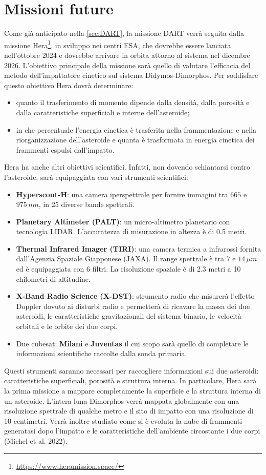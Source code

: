 \documentclass[a4paper,11pt,openright]{book}
\begin{document}
\section{Missioni future}
Come già anticipato nella \cref{sec:DART}, la missione DART verrà seguita dalla missione Hera\footnote{\href{https://www.heramission.space/}{https://www.heramission.space/}}, in sviluppo nei centri ESA, che dovrebbe essere lanciata nell'ottobre 2024 e dovrebbe arrivare in orbita attorno al sistema nel dicembre 2026. L'obiettivo principale della missione sarà quello di valutare l'efficacia del metodo dell'impattatore cinetico sul sistema Didymos-Dimorphos. Per soddisfare questo obiettivo Hera dovrà determinare: 
\begin{itemize}
    \item quanto il trasferimento di momento dipende dalla densità, dalla porosità e dalla caratteristiche superficiali e interne dell'asteroide;
    \item in che percentuale l'energia cinetica è trasferita nella frammentazione e nella riorganizzazione dell'asteroide e quanta è trasformata in energia cinetica dei frammenti espulsi dall'impatto.
\end{itemize}
Hera ha anche altri obiettivi scientifici. Infatti, non dovendo schiantarsi contro l'asteroide, sarà equipaggiata con vari strumenti scientifici:
\begin{itemize}
    \item \textbf{Hyperscout-H}: una camera iperspettrale per fornire immagini tra $665$ e $975\,nm$, in 25 diverse bande spettrali.
    \item \textbf{Planetary Altimeter (PALT)}: un micro-altimetro planetario con tecnologia LIDAR. L'accuratezza di misurazione in altezza è di 0.5 metri.
    \item \textbf{Thermal Infrared Imager (TIRI)}: una camera termica a infrarossi fornita dall'Agenzia Spaziale Giapponese (JAXA). Il range spettrale è tra $7$ e $14\,\mu m$ ed è equipaggiata con 6 filtri. La risoluzione spaziale è di 2.3 metri a 10 chilometri di altitudine.
    \item \textbf{X-Band Radio Science (X-DST)}: strumento radio che misurerà l'effetto Doppler dovuto ai disturbi radio e permetterà di ricavare la massa dei due asteroidi, le caratteristiche gravitazionali del sistema binario, le velocità orbitali e le orbite dei due corpi.
    \item Due cubesat: \textbf{Milani} e \textbf{Juventas} il cui scopo sarà quello di completare le informazioni scientifiche raccolte dalla sonda primaria.
\end{itemize}
Questi strumenti saranno necessari per raccogliere informazioni sui due asteroidi: caratteristiche superficiali, porosità e struttura interna. In particolare, Hera sarà la prima missione a mappare completamente la superficie e la struttura interna di un asteroide. L'intera luna Dimorphos verrà mappata globalmente con una risoluzione spettrale di qualche metro e il sito di impatto con una risoluzione di 10 centimetri. Verrà inoltre studiato come si è evoluta la nube di frammenti generatasi dopo l'impatto e le caratteristiche dell'ambiente circostante i due corpi (Michel et al. 2022).
\end{document}
